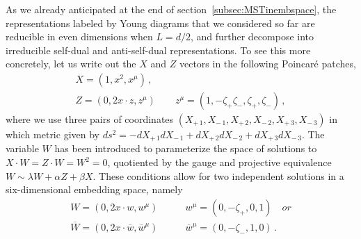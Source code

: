 \documentclass{article}
\begin{document}
As we already anticipated at the end of section~\ref{subsec:MSTinembspace}, the
representations labeled by Young diagrams that we considered so far are reducible in 
even dimensions when $L=d/2$, and further decompose into irreducible self-dual 
and anti-self-dual representations. To see this more concretely, let us write 
out the $X$ and $Z$ vectors in the following Poincar\'e patches,
\begin{equation}
    \begin{gathered}
    X=\left(1,x^2,x^\mu\right)\,,\\
    Z=\left(0,2x\cdot z, z^{\mu}\right) \qquad z^\mu =
    \left(1,-\zeta_+\zeta_-,\zeta_+,\zeta_-\right)\,,
\end{gathered}
\end{equation}
where we use three pairs of coordinates $(X_{+\,1},X_{-\,1},X_{+\,2},X_{-\,2},
X_{+\,3},X_{-\,3})$ in which metric given by  $ds^2 = -dX_{+\,1}dX_{-\,1}+dX_{+\,2}
dX_{-\,2}+dX_{+\,3}dX_{-\,3}$. The variable $W$ has been introduced to parameterize 
the space of solutions to $X\cdot W=Z\cdot W= W^2=0$, quotiented by the gauge and 
projective equivalence $W \sim \lambda W+\alpha Z +\beta X$. These conditions allow for two independent solutions in a six-dimensional 
embedding space, namely 
\begin{align}
    W=\left(0,2x\cdot w, w^\mu\right) \qquad &w^\mu = \left(0,-\zeta_+,0,1\right) 
    \quad \mathit{or} \label{PoincarepatchW}\\
    \overline{W}=\left(0,2x\cdot \overline{w}, \overline{w}^\mu\right) 
    \qquad &\overline{w}^\mu =
    \left(0,-\zeta_-,1,0\right)\,.\label{PoincarepatchWbar}
\end{align}
\end{document}
